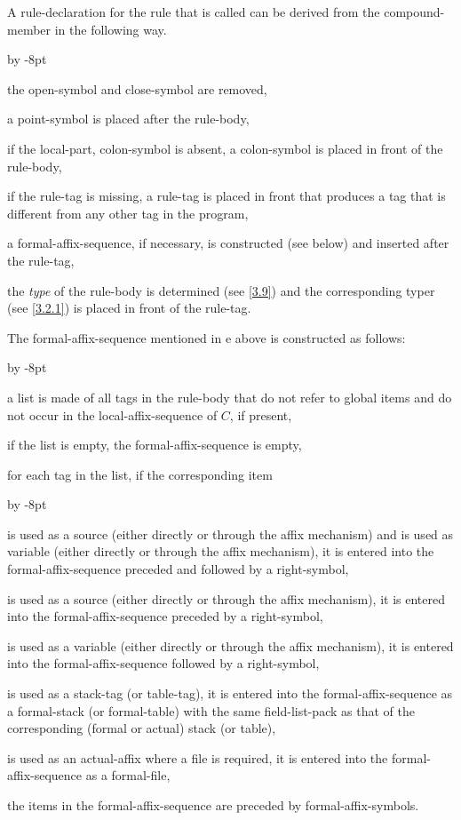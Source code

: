 \documentclass{article}
\newcommand\g[1]{{\sf #1}}
\renewenvironment{itemize}{\begin{list}{}{%
\advance\leftmargin by -8pt%
\setlength\itemsep{0ex plus 0.2ex}%
\setlength\partopsep{3pt}%
\setlength\topsep{2pt plus 2pt}%
\setlength\parsep{0pt plus 2pt}%
}}{\end{list}}
\begin{document}
\smallskip
A \g{rule-declaration} for the rule that is called can be derived from the
\g{compound-member} in the following way.
\begin{itemize}
\item[a.] the \g{open-symbol} and \g{close-symbol} are removed,
\item[b.] a \g{point-symbol} is placed after the \g{rule-body},
\item[c.] if the \g{local-part, colon-symbol} is absent, a \g{colon-symbol}
is placed in front of the \g{rule-body},
\item[d.] if the \g{rule-tag} is missing, a \g{rule-tag} is placed in front
that produces a \g{tag} that is different from any other \g{tag} in the program,
\item[e.] a \g{formal-affix-sequence}, if necessary, is constructed (see
below) and inserted after the \g{rule-tag},
\item[f.] the \emph{type} of the \g{rule-body} is determined (see \ref{3.9})
 and the
corresponding \g{typer} (see \ref{3.2.1}) is placed in front of the \g{rule-tag}.
\end{itemize}
The \g{formal-affix-sequence} mentioned in e above is constructed as
follows:
\begin{itemize}
\item[a.] a list is made of all tags in the \g{rule-body} that do not refer
to global items and do not occur in the \g{local-affix-sequence} of $C$, if
present,
\item[b.] if the list is empty, the \g{formal-affix-sequence} is empty,
\item[c.] for each tag in the list, if the corresponding item
\begin{itemize}
\item[1.] is used as a \g{source} (either directly or through the affix
mechanism) and is
used as \g{variable} (either directly or through the affix mechanism), it is entered
into the \g{formal-affix-sequence} preceded and followed by a \g{right-symbol},
\item[2.] is used as a \g{source} (either directly or through the affix
mechanism), it is
entered into the \g{formal-affix-sequence} preceded by a \g{right-symbol},
\item[3.] is used as a \g{variable} (either directly or through the affix
mechanism),
it is entered into the \g{formal-affix-sequence} followed by a \g{right-symbol},
\item[4.] is used as a \g{stack-tag} (or \g{table-tag}), it is entered into
the \g{formal-affix-sequence} as a
\g{formal-stack} (or \g{formal-table}) with the same \g{field-list-pack}
as that of the corresponding (formal or actual) stack (or table),
\item[5.] is used as an \g{actual-affix} where a file is required, it is
entered into the \g{formal-affix-sequence} as a \g{formal-file},
\end{itemize}
\item[d.] the items in the \g{formal-affix-sequence} are preceded by
\g{formal-affix-symbol}s.
\end{itemize}
\end{document}
